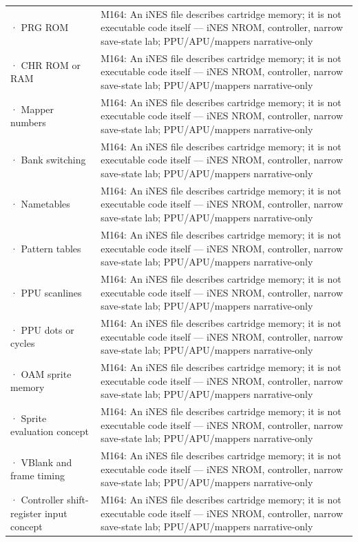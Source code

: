 {\begin{longtable}[]{@{}
  >{\raggedright\arraybackslash}p{}
  >{\raggedright\arraybackslash}p{}@{}}
2730 · PRG ROM & M164: An iNES file describes cartridge memory; it is not executable code itself --- iNES NROM, controller, narrow save-state lab; PPU/APU/mappers narrative-only \\
2731 · CHR ROM or RAM & M164: An iNES file describes cartridge memory; it is not executable code itself --- iNES NROM, controller, narrow save-state lab; PPU/APU/mappers narrative-only \\
2732 · Mapper numbers & M164: An iNES file describes cartridge memory; it is not executable code itself --- iNES NROM, controller, narrow save-state lab; PPU/APU/mappers narrative-only \\
2733 · Bank switching & M164: An iNES file describes cartridge memory; it is not executable code itself --- iNES NROM, controller, narrow save-state lab; PPU/APU/mappers narrative-only \\
2734 · Nametables & M164: An iNES file describes cartridge memory; it is not executable code itself --- iNES NROM, controller, narrow save-state lab; PPU/APU/mappers narrative-only \\
2735 · Pattern tables & M164: An iNES file describes cartridge memory; it is not executable code itself --- iNES NROM, controller, narrow save-state lab; PPU/APU/mappers narrative-only \\
2736 · PPU scanlines & M164: An iNES file describes cartridge memory; it is not executable code itself --- iNES NROM, controller, narrow save-state lab; PPU/APU/mappers narrative-only \\
2737 · PPU dots or cycles & M164: An iNES file describes cartridge memory; it is not executable code itself --- iNES NROM, controller, narrow save-state lab; PPU/APU/mappers narrative-only \\
2738 · OAM sprite memory & M164: An iNES file describes cartridge memory; it is not executable code itself --- iNES NROM, controller, narrow save-state lab; PPU/APU/mappers narrative-only \\
2739 · Sprite evaluation concept & M164: An iNES file describes cartridge memory; it is not executable code itself --- iNES NROM, controller, narrow save-state lab; PPU/APU/mappers narrative-only \\
2740 · VBlank and frame timing & M164: An iNES file describes cartridge memory; it is not executable code itself --- iNES NROM, controller, narrow save-state lab; PPU/APU/mappers narrative-only \\
2741 · Controller shift-register input concept & M164: An iNES file describes cartridge memory; it is not executable code itself --- iNES NROM, controller, narrow save-state lab; PPU/APU/mappers narrative-only \\

\end{longtable}}
